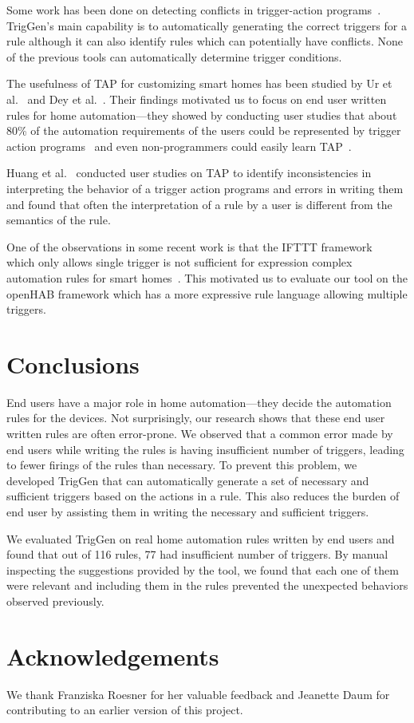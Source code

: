 \documentclass{sig-alternate-05-2015}
\begin{document}
Some work has been done on detecting conflicts in trigger-action programs~\cite{rvs, homer, utea, Nakamura05featureinteractions}. TrigGen's main capability is to automatically generating the correct triggers for a rule although it can also identify rules which can potentially have conflicts. None of the previous tools can automatically determine trigger conditions.

The usefulness of TAP for customizing smart homes has been studied by Ur et al.~\cite{practical-tap} and Dey et al.~\cite{dey}. Their findings motivated us to focus on end user written rules for home automation---they showed by conducting user studies that about 80\% of the automation requirements of the users could be represented by trigger action programs~\cite{dey} and even non-programmers could easily learn TAP~\cite{practical-tap}.

Huang et al.~\cite{Huang} conducted user studies on TAP to identify inconsistencies in interpreting the behavior of a trigger action programs and errors in writing them and found that often the interpretation of a rule by a user is different from the semantics of the rule. 

One of the observations in some recent work is that the IFTTT framework~\cite{iftttframework} which only allows single trigger is not sufficient for expression complex automation rules for smart homes~\cite{Huang, practical-tap}. This motivated us to evaluate our tool on the openHAB framework which has a more expressive rule language allowing multiple triggers. 


\section{Conclusions}
End users have a major role in home automation---they decide the automation rules for the devices. Not surprisingly, our research shows that these end user written rules are often error-prone.
We observed that a common error made by end users while writing the rules is having insufficient number of triggers, leading to fewer firings of the rules than necessary. To prevent this problem, we developed TrigGen that can automatically generate a set of necessary and sufficient triggers based on the actions in a rule. This also reduces the burden of end user by assisting them in writing the necessary and sufficient triggers. 

We evaluated TrigGen on real home automation rules written by end users and found that out of 116 rules, 77 had insufficient number of triggers. By manual inspecting the suggestions provided by the tool, we found that each one of them were relevant and including them in the rules prevented the unexpected behaviors observed previously. 


\section{Acknowledgements}
We thank Franziska Roesner for her valuable feedback and Jeanette Daum for contributing to an earlier version of this project.

  
\end{document}
